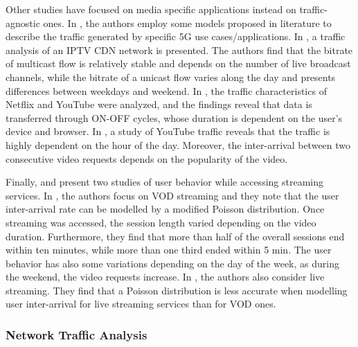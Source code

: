 Other studies have focused on media specific applications instead on traffic-agnostic ones. In \cite{Navarro-Ortiz2020}, the authors employ some models proposed in literature to describe the traffic generated by specific 5G use cases/applications. In \cite{Liu2009}, a traffic analysis of an IPTV CDN network is presented. The authors find that the bitrate of multicast flow is relatively stable and depends on the number of live broadcast channels, while the bitrate of a unicast flow varies along the day and presents differences between weekdays and weekend. In \cite{rao2011}, the traffic characteristics of Netflix and YouTube were analyzed, and the findings reveal that data is transferred through ON-OFF cycles, whose duration is dependent on the user's device and browser. In \cite{zink2009}, a study of YouTube traffic reveals that the traffic is highly dependent on the hour of the day. Moreover, the inter-arrival between two consecutive video requests depends on the popularity of the video.

Finally, \cite{yu2006} and \cite{Liu2014} present two studies of user behavior while accessing streaming services. In \cite{yu2006}, the authors focus on VOD streaming and they note that the user inter-arrival rate can be modelled by a modified Poisson distribution. Once streaming was accessed, the session length varied depending on the video duration. Furthermore, they find that more than half of the overall sessions end within ten minutes, while more than one third ended within 5 min. The user behavior has also some variations depending on the day of the week, as during the weekend, the video requests increase. In \cite{Liu2014}, the authors also consider live streaming. They find that a Poisson distribution is less accurate when modelling user inter-arrival for live streaming services than for VOD ones.

\subsubsection{Network Traffic Analysis}
\label{sec:IEEECOMSTanalysis}

